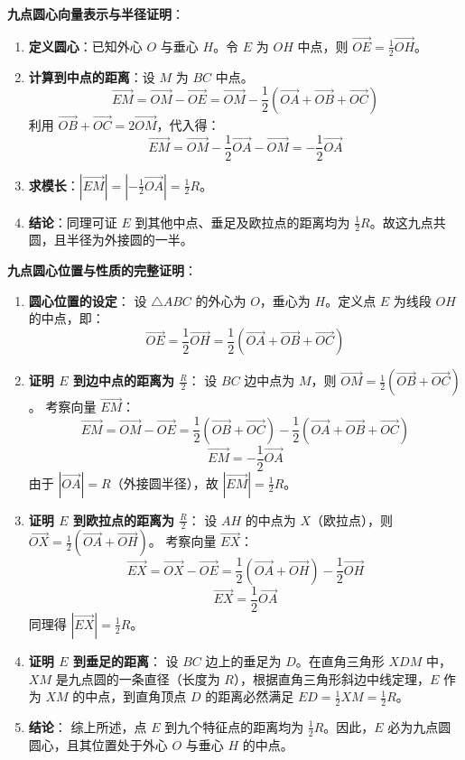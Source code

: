 \begin{proofbox}
\textbf{九点圆心向量表示与半径证明}：
\begin{enumerate}
    \item \textbf{定义圆心}：已知外心 $O$ 与垂心 $H$。令 $E$ 为 $OH$ 中点，则 $\vec{OE} = \frac{1}{2}\vec{OH}$。
    \item \textbf{计算到中点的距离}：设 $M$ 为 $BC$ 中点。
    \[ \vec{EM} = \vec{OM} - \vec{OE} = \vec{OM} - \frac{1}{2}(\vec{OA} + \vec{OB} + \vec{OC}) \]
    利用 $\vec{OB} + \vec{OC} = 2\vec{OM}$，代入得：
    \[ \vec{EM} = \vec{OM} - \frac{1}{2}\vec{OA} - \vec{OM} = -\frac{1}{2}\vec{OA} \]
    \item \textbf{求模长}：$|\vec{EM}| = |-\frac{1}{2}\vec{OA}| = \frac{1}{2}R$。
    \item \textbf{结论}：同理可证 $E$ 到其他中点、垂足及欧拉点的距离均为 $\frac{1}{2}R$。故这九点共圆，且半径为外接圆的一半。
\end{enumerate}
\end{proofbox}

\begin{proofbox}
\textbf{九点圆心位置与性质的完整证明}：

\begin{enumerate}
    \item \textbf{圆心位置的设定}：
    设 $\triangle ABC$ 的外心为 $O$，垂心为 $H$。定义点 $E$ 为线段 $OH$ 的中点，即：
    \[ \vec{OE} = \frac{1}{2}\vec{OH} = \frac{1}{2}(\vec{OA} + \vec{OB} + \vec{OC}) \]

    \item \textbf{证明 $E$ 到边中点的距离为 $\frac{R}{2}$}：
    设 $BC$ 边中点为 $M$，则 $\vec{OM} = \frac{1}{2}(\vec{OB} + \vec{OC})$。
    考察向量 $\vec{EM}$：
    \[ \vec{EM} = \vec{OM} - \vec{OE} = \frac{1}{2}(\vec{OB} + \vec{OC}) - \frac{1}{2}(\vec{OA} + \vec{OB} + \vec{OC}) \]
    \[ \vec{EM} = -\frac{1}{2}\vec{OA} \]
    由于 $|\vec{OA}| = R$（外接圆半径），故 $|\vec{EM}| = \frac{1}{2}R$。

    \item \textbf{证明 $E$ 到欧拉点的距离为 $\frac{R}{2}$}：
    设 $AH$ 的中点为 $X$（欧拉点），则 $\vec{OX} = \frac{1}{2}(\vec{OA} + \vec{OH})$。
    考察向量 $\vec{EX}$：
    \[ \vec{EX} = \vec{OX} - \vec{OE} = \frac{1}{2}(\vec{OA} + \vec{OH}) - \frac{1}{2}\vec{OH} \]
    \[ \vec{EX} = \frac{1}{2}\vec{OA} \]
    同理得 $|\vec{EX}| = \frac{1}{2}R$。

    \item \textbf{证明 $E$ 到垂足的距离}：
    设 $BC$ 边上的垂足为 $D$。在直角三角形 $XDM$ 中，$XM$ 是九点圆的一条直径（长度为 $R$），根据直角三角形斜边中线定理，$E$ 作为 $XM$ 的中点，到直角顶点 $D$ 的距离必然满足 $ED = \frac{1}{2}XM = \frac{1}{2}R$。

    \item \textbf{结论}：
    综上所述，点 $E$ 到九个特征点的距离均为 $\frac{1}{2}R$。因此，$E$ 必为九点圆圆心，且其位置处于外心 $O$ 与垂心 $H$ 的中点。
\end{enumerate}
\end{proofbox}